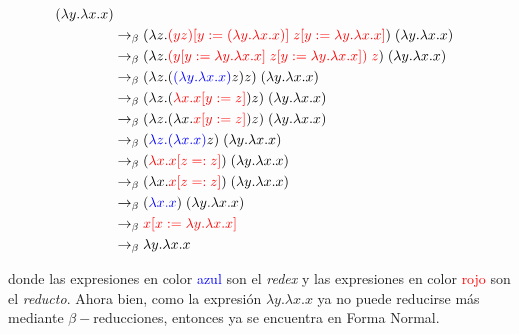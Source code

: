 \documentclass[letterpaper,11pt]{article}
\begin{document}
\begin{enumerate}
\begin{enumerate}
\begin{align*}
            \; (\lambda y. \lambda x.x) \\
            &\rightarrow_{\beta}
            (\lambda z. \textcolor{red}{(yz) [y := (\lambda y. \lambda x.x)] \; 
                                         z[y := \lambda y. \lambda x.x]}) 
            \; (\lambda y. \lambda x.x) \\
            &\rightarrow_{\beta} 
            (\lambda z. \textcolor{red}{(y [y := \lambda y. \lambda x.x] \; 
                                          z [y := \lambda y. \lambda x.x]) \; 
                                          z}) \; 
            (\lambda y. \lambda x.x) \\ 
            &\rightarrow_{\beta}
            (\lambda z. (\textcolor{blue}{(\lambda y. \lambda x.x)} z)z) \; 
            (\lambda y. \lambda x.x) \\
            &\rightarrow_{\beta}
            (\lambda z. (\textcolor{red}{\lambda x.x [y := z]}) z) \; 
            (\lambda y. \lambda x.x) \\
            &\rightarrow_{\beta}
            (\lambda z. (\lambda x. \textcolor{red}{x [y := z]}) z) \; 
            (\lambda y. \lambda x.x) \\
            &\rightarrow_{\beta}
            (\textcolor{blue}{\lambda z. (\lambda x. x)} z) \; 
            (\lambda y. \lambda x.x) \\
            &\rightarrow_{\beta}
            (\textcolor{red}{\lambda x.x [z =: z]}) \; 
            (\lambda y. \lambda x.x) \\
            &\rightarrow_{\beta}
            (\lambda x. \textcolor{red}{x [z =: z]}) \; 
            (\lambda y. \lambda x.x) \\
            &\rightarrow_{\beta}
            (\textcolor{blue}{\lambda x. x}) \; 
            (\lambda y. \lambda x.x) \\
            &\rightarrow_{\beta}
            \textcolor{red}{x [x := \lambda y. \lambda x.x]} \\
            &\rightarrow_{\beta} \lambda y. \lambda x.x
        \end{align*}

        donde las expresiones en color \textcolor{blue}{azul} son el 
        \textit{redex} y las expresiones en color \textcolor{red}{rojo} son el 
        \textit{reducto}. Ahora bien, como la expresión $\lambda y. \lambda x.x$
        ya no puede reducirse más mediante $\beta-$reducciones, entonces ya se 
        encuentra en Forma Normal.
    \end{enumerate}


\end{enumerate}
\end{document}
